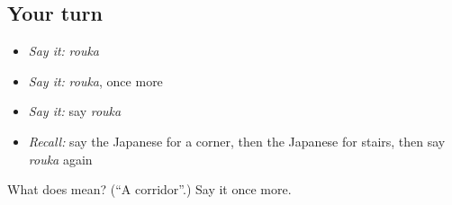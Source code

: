 \subsection*{Your turn}
\begin{itemize}
\raggedright
  \item \emph{Say it:} \emph{rouka}
  \item \emph{Say it:} \emph{rouka}, once more
  \item \emph{Say it:} say \emph{rouka}
  \item \emph{Recall:} say the Japanese for a corner, then the Japanese for stairs, then say \emph{rouka} again
\end{itemize}

\begin{tcolorbox}[breakable,colback=teal!4,colframe=teal!35!black,title={Before you move on}]
What does  mean? (\textquotedblleft{}A corridor\textquotedblright{}.) Say it once more.
\end{tcolorbox}
